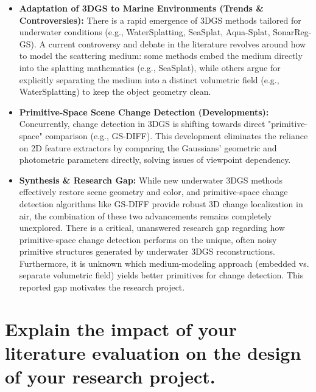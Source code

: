 \documentclass[12pt, a4paper]{article}
\begin{document}
\begin{itemize}
    \item \textbf{Adaptation of 3DGS to Marine Environments (Trends \& Controversies):} There is a rapid emergence of 3DGS methods tailored for underwater conditions (e.g., WaterSplatting, SeaSplat, Aqua-Splat, SonarReg-GS). A current controversy and debate in the literature revolves around how to model the scattering medium: some methods embed the medium directly into the splatting mathematics (e.g., SeaSplat), while others argue for explicitly separating the medium into a distinct volumetric field (e.g., WaterSplatting) to keep the object geometry clean.
    \item \textbf{Primitive-Space Scene Change Detection (Developments):} Concurrently, change detection in 3DGS is shifting towards direct "primitive-space" comparison (e.g., GS-DIFF). This development eliminates the reliance on 2D feature extractors by comparing the Gaussians' geometric and photometric parameters directly, solving issues of viewpoint dependency.
    \item \textbf{Synthesis \& Research Gap:} While new underwater 3DGS methods effectively restore scene geometry and color, and primitive-space change detection algorithms like GS-DIFF provide robust 3D change localization in air, the combination of these two advancements remains completely unexplored. There is a critical, unanswered research gap regarding how primitive-space change detection performs on the unique, often noisy primitive structures generated by underwater 3DGS reconstructions. Furthermore, it is unknown which medium-modeling approach (embedded vs. separate volumetric field) yields better primitives for change detection. This reported gap motivates the research project.
\end{itemize}

\section*{Explain the impact of your literature evaluation on the design of your research project.}
\end{document}
